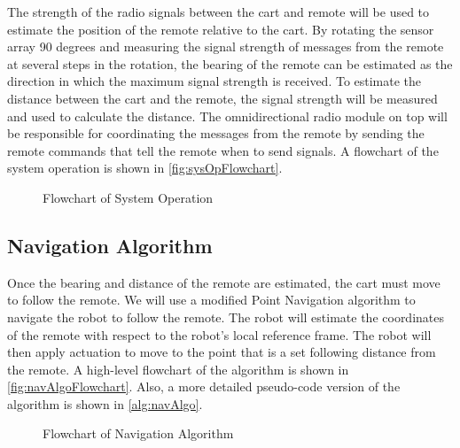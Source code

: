 \documentclass[letterpaper,12pt]{article}   %
\begin{document}
\vspace*{12pt}
\noindent
The strength of the radio signals between the cart and remote will be used to estimate the position of the remote relative to the cart. By rotating the sensor array 90 degrees and measuring the signal strength of messages from the remote at several steps in the rotation, the bearing of the remote can be estimated as the direction in which the maximum signal strength is received. To estimate the distance between the cart and the remote, the signal strength will be measured and used to calculate the distance. The omnidirectional radio module on top will be responsible for coordinating the messages from the remote by sending the remote commands that tell the remote when to send signals. A flowchart of the system operation is shown in \autoref{fig:sysOpFlowchart}.

\begin{figure}
  \centering
  
  \caption{Flowchart of System Operation}
  \label{fig:sysOpFlowchart}
\end{figure}

\subsection{Navigation Algorithm}
Once the bearing and distance of the remote are estimated, the cart must move to follow the remote. We will use a modified Point Navigation algorithm to navigate the robot to follow the remote. The robot will estimate the coordinates of the remote with respect to the robot's local reference frame. The robot will then apply actuation to move to the point that is a set following distance from the remote. A high-level flowchart of the algorithm is shown in \autoref{fig:navAlgoFlowchart}. Also, a more detailed pseudo-code version of the algorithm is shown in \autoref{alg:navAlgo}.

\begin{figure}
  \centering
  
  \caption{Flowchart of Navigation Algorithm}
  \label{fig:navAlgoFlowchart}
\end{figure}
\end{document}

